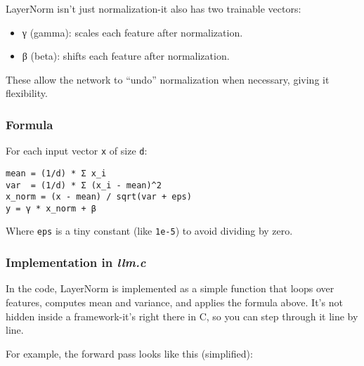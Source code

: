 \documentclass[
  letterpaper,
  DIV=11,
  numbers=noendperiod]{scrreprt}
\providecommand{\tightlist}{%
  \setlength{\itemsep}{0pt}\setlength{\parskip}{0pt}}
\begin{document}
LayerNorm isn't just normalization-it also has two trainable vectors:

\begin{itemize}
\tightlist
\item
  γ (gamma): scales each feature after normalization.
\item
  β (beta): shifts each feature after normalization.
\end{itemize}

These allow the network to ``undo'' normalization when necessary, giving
it flexibility.

\subsubsection{Formula}\label{formula}

For each input vector \texttt{x} of size \texttt{d}:

\begin{verbatim}
mean = (1/d) * Σ x_i
var  = (1/d) * Σ (x_i - mean)^2
x_norm = (x - mean) / sqrt(var + eps)
y = γ * x_norm + β
\end{verbatim}

Where \texttt{eps} is a tiny constant (like \texttt{1e-5}) to avoid
dividing by zero.

\subsubsection{\texorpdfstring{Implementation in
\emph{llm.c}}{Implementation in llm.c}}\label{implementation-in-llm.c-2}

In the code, LayerNorm is implemented as a simple function that loops
over features, computes mean and variance, and applies the formula
above. It's not hidden inside a framework-it's right there in C, so you
can step through it line by line.

For example, the forward pass looks like this (simplified):
\end{document}
